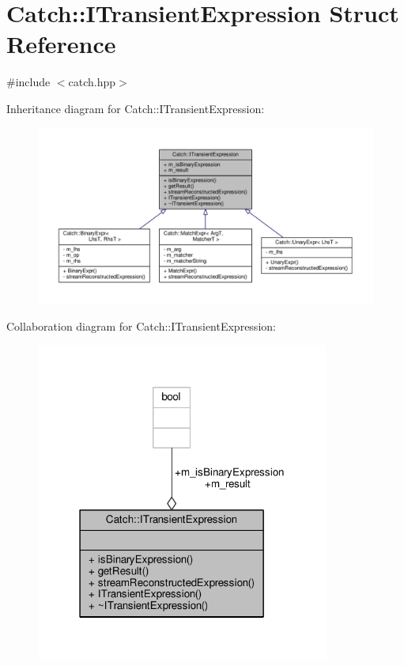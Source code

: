 \hypertarget{struct_catch_1_1_i_transient_expression}{\section{Catch\-:\-:I\-Transient\-Expression Struct Reference}
\label{struct_catch_1_1_i_transient_expression}
}


{\ttfamily \#include $<$catch.\-hpp$>$}



Inheritance diagram for Catch\-:\-:I\-Transient\-Expression\-:
\nopagebreak
\begin{figure}[H]
\begin{center}
\leavevmode
\includegraphics[width=350pt]{struct_catch_1_1_i_transient_expression__inherit__graph}
\end{center}
\end{figure}


Collaboration diagram for Catch\-:\-:I\-Transient\-Expression\-:
\nopagebreak
\begin{figure}[H]
\begin{center}
\leavevmode
\includegraphics[width=274pt]{struct_catch_1_1_i_transient_expression__coll__graph}
\end{center}
\end{figure}
